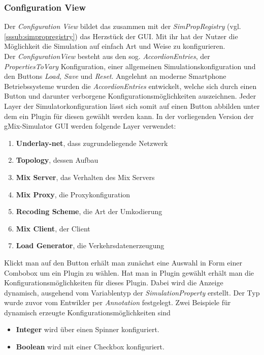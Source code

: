 \documentclass[a4paper, 11pt]{article} %
\begin{document}
\subsubsection{Configuration View} %
\label{ssub:configview}
Der \emph{Configuration View} bildet das zusammen mit der \emph{SimPropRegistry} (vgl. \ref{sssub:simpropregistry}) das Herzstück der GUI. Mit ihr hat der Nutzer die Möglichkeit die Simulation auf einfach Art und Weise zu konfigurieren. \\
Der \emph{ConfigurationView} besteht aus den sog. \emph{AccordionEntries}, der \emph{PropertiesToVary} Konfiguration, einer allgemeinen Simulationskonfiguration und den Buttons \emph{Load, Save} und \emph{Reset}. Angelehnt an moderne Smartphone Betriebssysteme wurden die \emph{AccordionEntries} entwickelt, welche sich durch einen Button und darunter verborgene Konfigurationsmöglichkeiten auszeichnen. Jeder Layer der Simulatorkonfiguration lässt sich somit auf einen Button abbilden unter dem ein Plugin für diesen gewählt werden kann. In der vorliegenden Version der gMix-Simulator GUI werden folgende Layer verwendet:
\begin{enumerate}
\item \textbf{Underlay-net}, dass zugrundeliegende Netzwerk
\item \textbf{Topology}, dessen Aufbau
\item \textbf{Mix Server}, das Verhalten des Mix Servers
\item \textbf{Mix Proxy}, die Proxykonfiguration
\item \textbf{Recoding Scheme}, die Art der Umkodierung
\item \textbf{Mix Client}, der Client
\item \textbf{Load Generator}, die Verkehrsdatenerzeugung
\end{enumerate}
 Klickt man auf den Button erhält man zunächst eine Auswahl in Form einer Combobox um ein Plugin zu wählen. Hat man in Plugin gewählt erhält man die Konfigurationsmöglichkeiten für dieses Plugin. Dabei wird die Anzeige dynamisch, ausgehend vom Variablentyp der \emph{SimulationProperty} erstellt. Der Typ wurde zuvor vom Entwikler per \emph{Annotation} festgelegt. Zwei Beispiele für dynamisch erzeugte Konfigurationsmöglichkeiten sind
 \begin{itemize}
 \item \textbf{Integer} wird über einen Spinner konfiguriert. 
 \item \textbf{Boolean} wird mit einer Checkbox konfiguriert.
 \end{itemize}
\end{document}
